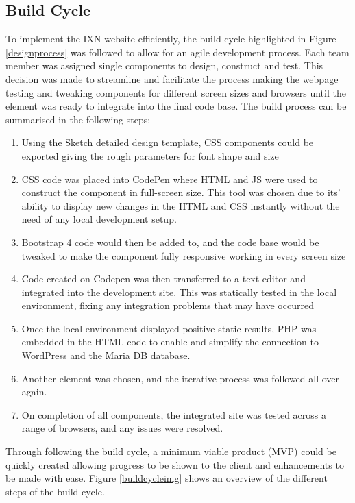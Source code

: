 \documentclass[fontsize=11pt]{extarticle}
\numberwithin{figure}{section} %
\providecommand{\tightlist}{%
  \setlength{\itemsep}{0pt}\setlength{\parskip}{0pt}}
\begin{document}
\hypertarget{build-cycle}{%
\subsection{Build Cycle}\label{build-cycle}}

To implement the IXN website efficiently, the build cycle highlighted in
Figure \ref{designprocess} was followed to allow for an agile
development process. Each team member was assigned single components to
design, construct and test. This decision was made to streamline and
facilitate the process making the webpage testing and tweaking
components for different screen sizes and browsers until the element was
ready to integrate into the final code base. The build process can be
summarised in the following steps:

\begin{enumerate}

\tightlist
\item
  Using the Sketch detailed design template, CSS components could be
  exported giving the rough parameters for font shape and size
\item
  CSS code was placed into CodePen where HTML and JS were used to
  construct the component in full-screen size. This tool was chosen due
  to its' ability to display new changes in the HTML and CSS instantly
  without the need of any local development setup.
\item
  Bootstrap 4 code would then be added to, and the code base would be
  tweaked to make the component fully responsive working in every screen
  size
\item
  Code created on Codepen was then transferred to a text editor and
  integrated into the development site. This was statically tested in
  the local environment, fixing any integration problems that may have
  occurred
\item
  Once the local environment displayed positive static results, PHP was
  embedded in the HTML code to enable and simplify the connection to
  WordPress and the Maria DB database.
\item
  Another element was chosen, and the iterative process was followed all
  over again.
\item
  On completion of all components, the integrated site was tested across
  a range of browsers, and any issues were resolved.
\end{enumerate}

Through following the build cycle, a minimum viable product (MVP) could
be quickly created allowing progress to be shown to the client and
enhancements to be made with ease. Figure \ref{buildcycleimg} shows an
overview of the different steps of the build cycle.
\end{document}
